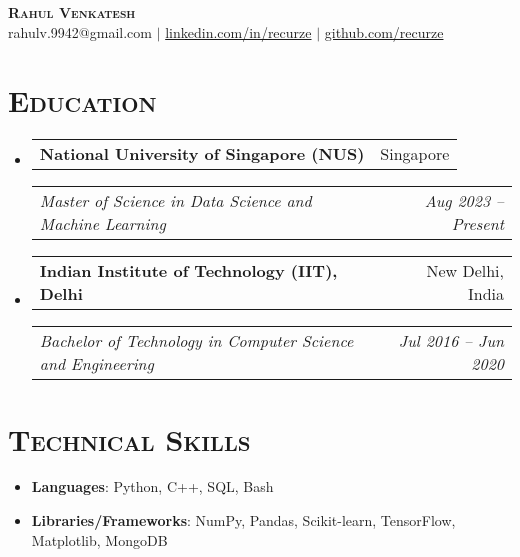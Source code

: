 \documentclass[11pt]{article}
\makeatletter
\newcommand{\headerrow}[2]
{\begin{tabular*}{\linewidth}{l@{\extracolsep{\fill}}r}
    #1 &
    #2 \\
\end{tabular*}}
\makeatother
\begin{document}
\thispagestyle{empty}

\begin{center}
    {\huge \textsc{\textbf{Rahul Venkatesh}}} \\[2pt]
    rahulv.9942@gmail.com
    $\mid$
    \href{https://www.linkedin.com/in/recurze}{linkedin.com/in/recurze}
    $\mid$
    \href{https://github.com/recurze}{github.com/recurze}
\end{center}

\section*{\textsc{\textbf{Education}}}
\begin{itemize}[leftmargin=0em]

\item[]
    \headerrow {\textbf{National University of Singapore (NUS)}}{Singapore}
    \headerrow {\emph{Master of Science in Data Science and Machine Learning}}{\emph{Aug 2023 -- Present}}

\item[]
    \headerrow {\textbf{Indian Institute of Technology (IIT), Delhi}}{New Delhi, India}
    \headerrow {\emph{Bachelor of Technology in Computer Science and Engineering}}{\emph{Jul 2016 -- Jun 2020}}

\end{itemize}

\section*{\textsc{\textbf{Technical Skills}}}
\begin{itemize}[itemsep=0em, leftmargin=0.7em]
\item[]
    \textbf{Languages}: Python, C++, SQL, Bash
\item[]
    \textbf{Libraries/Frameworks}: NumPy, Pandas, Scikit-learn, TensorFlow, Matplotlib, MongoDB
\end{itemize}
\end{document}
